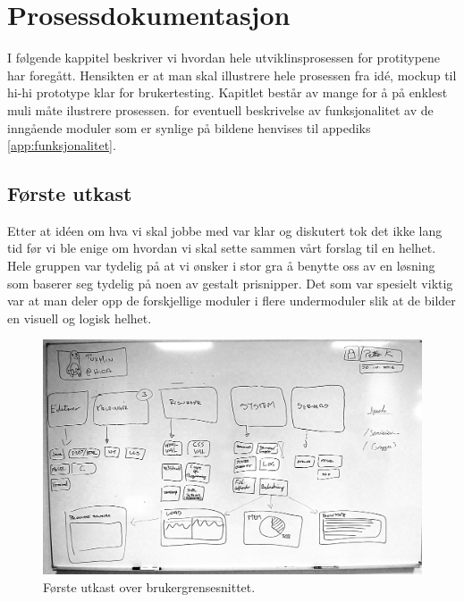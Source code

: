 \chapter{Prosessdokumentasjon}
\lettrine[lines=2]{I}{} følgende kappitel beskriver vi hvordan hele utviklinsprosessen for protitypene har foregått. Hensikten er at man skal illustrere hele prosessen fra idé, mockup til hi-hi prototype klar for brukertesting. Kapitlet består av mange for å på enklest muli måte ilustrere prosessen. for eventuell beskrivelse av funksjonalitet av de inngående moduler som er synlige på bildene henvises til appediks \ref{app:funksjonalitet}.



\section{Første utkast}
Etter at idéen om hva vi skal jobbe med var klar og diskutert tok det ikke lang tid før vi ble enige om hvordan vi skal sette sammen vårt forslag til en helhet. Hele gruppen var tydelig på at vi ønsker i stor gra å benytte oss av en løsning som baserer seg tydelig på noen av gestalt prisnipper.
Det som var spesielt viktig var at man deler opp de forskjellige moduler i flere undermoduler slik at de bilder en visuell og logisk helhet. 



\begin{figure}[ht]
\includegraphics[width=\textwidth,height=\textheight,keepaspectratio]{./img/prosessdokumentasjon/foersteutkast/foerste.jpg}
\caption[Første utkast]{Første utkast over brukergrensesnittet.}
\label{fig:foersteutkast}
\end{figure}

